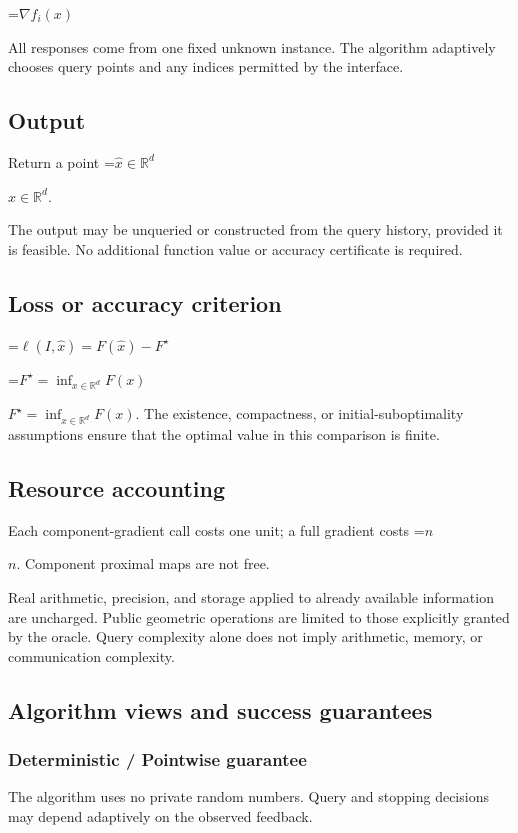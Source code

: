 \documentclass[10pt,a4paper]{article}
\newcommand{\AtlasMath}[1]{\par\begingroup\centering\setbox0=\hbox{$\displaystyle #1$}\ifdim\wd0>1.4\linewidth\typeout{ATLAS WIDE FORMULA: \the\wd0}\fi\ifdim\wd0>\linewidth\resizebox{\linewidth}{!}{\box0}\else\box0\fi\par\endgroup}
\newcommand{\AtlasInlineMath}[1]{\begingroup\setbox0=\hbox{$#1$}\ifdim\wd0>.4\linewidth\endgroup\AtlasMath{#1}\else\endgroup$#1$\fi}
\begin{document}
\AtlasMath{\nabla f_i(x)}


All responses come from one fixed unknown instance. The algorithm adaptively chooses query points and any indices permitted by the interface.

\subsection{Output}
Return a point \AtlasInlineMath{\widehat x\in\mathbb R^d}.

The output may be unqueried or constructed from the query history, provided it is feasible. No additional function value or accuracy certificate is required.

\subsection{Loss or accuracy criterion}

\AtlasMath{\ell(I,\widehat{x})=F(\widehat{x})-F^\star}


\AtlasInlineMath{F^\star=\inf_{x\in \mathbb{R}^d}F(x)}. The existence, compactness, or initial-suboptimality assumptions ensure that the optimal value in this comparison is finite.

\subsection{Resource accounting}
Each component-gradient call costs one unit; a full gradient costs \AtlasInlineMath{n}. Component proximal maps are not free.

Real arithmetic, precision, and storage applied to already available information are uncharged. Public geometric operations are limited to those explicitly granted by the oracle. Query complexity alone does not imply arithmetic, memory, or communication complexity.

\subsection{Algorithm views and success guarantees}
\subsubsection{Deterministic / Pointwise guarantee}
The algorithm uses no private random numbers. Query and stopping decisions may depend adaptively on the observed feedback.
\end{document}

